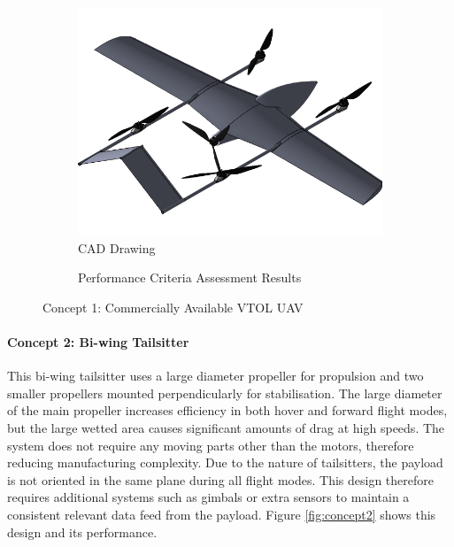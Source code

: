 \begin{figure}[H]
\centering
\begin{subfigure}[t]{.5\textwidth}
  \centering
  \includegraphics[width=0.85\linewidth]{Concepts/CAD/1cad.png}
  \caption{CAD Drawing}
  \label{fig:cad1}
\end{subfigure}%
\begin{subfigure}[t]{.5\textwidth}
  \centering
  \caption{Performance Criteria Assessment Results}
  \label{fig:radar1}
\end{subfigure}
\caption{Concept 1: Commercially Available VTOL UAV}
\label{fig:concept1}
\end{figure}


\paragraph{Concept 2: Bi-wing Tailsitter}
This bi-wing tailsitter uses a large diameter propeller for propulsion and two smaller propellers mounted perpendicularly for stabilisation. The large diameter of the main propeller increases efficiency in both hover and forward flight modes, but the large wetted area causes significant amounts of drag at high speeds. The system does not require any moving parts other than the motors, therefore reducing manufacturing complexity. Due to the nature of tailsitters, the payload is not oriented in the same plane during all flight modes. This design therefore requires additional systems such as gimbals or extra sensors to maintain a consistent relevant data feed from the payload. Figure \ref{fig:concept2} shows this design and its performance.



